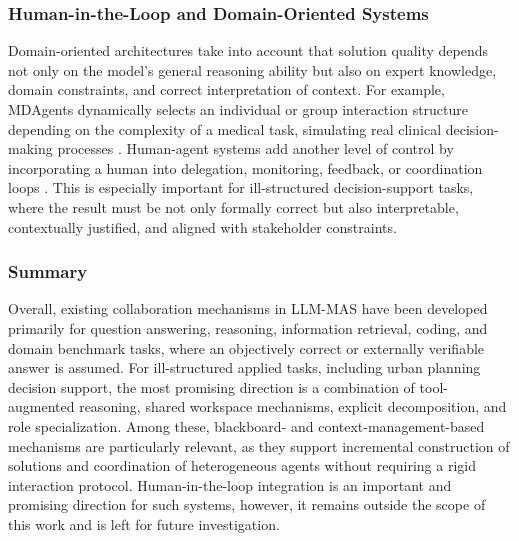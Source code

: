 \subsubsection{Human-in-the-Loop and Domain-Oriented Systems}

Domain-oriented architectures take into account that solution quality depends not only on the model's general reasoning ability but also on expert knowledge, domain constraints, and correct interpretation of context.
For example, MDAgents dynamically selects an individual or group interaction structure depending on the complexity of a medical task, simulating real clinical decision-making processes \cite{kim2024mdagents}.
Human-agent systems add another level of control by incorporating a human into delegation, monitoring, feedback, or coordination loops \cite{zou2025humanagent}.
This is especially important for ill-structured decision-support tasks, where the result must be not only formally correct but also interpretable, contextually justified, and aligned with stakeholder constraints.

\subsubsection{Summary}
Overall, existing collaboration mechanisms in LLM-MAS have been developed primarily for question answering, reasoning, information retrieval, coding, and domain benchmark tasks, where an objectively correct or externally verifiable answer is assumed.
For ill-structured applied tasks, including urban planning decision support, the most promising direction is a combination of tool-augmented reasoning, shared workspace mechanisms, explicit decomposition, and role specialization.
Among these, blackboard- and context-management-based mechanisms are particularly relevant, as they support incremental construction of solutions and coordination of heterogeneous agents without requiring a rigid interaction protocol.
Human-in-the-loop integration is an important and promising direction for such systems, however, it remains outside the scope of this work and is left for future investigation.